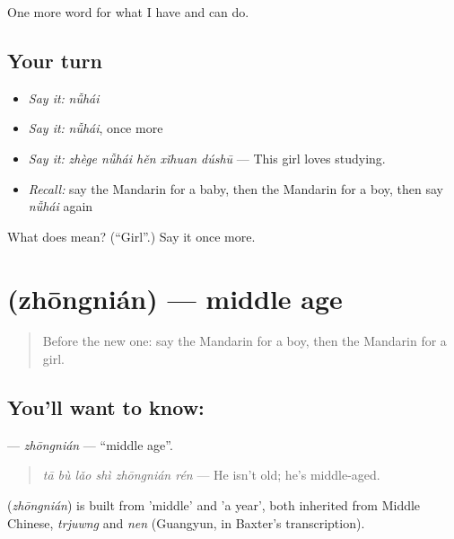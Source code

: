 \begin{grammarlens}[title={What you've built}]
One more word for what I have and can do.
\end{grammarlens}

\subsection*{Your turn}
\begin{itemize}
\raggedright
  \item \emph{Say it:} \emph{nǚhái}
  \item \emph{Say it:} \emph{nǚhái}, once more
  \item \emph{Say it:} \emph{zhège nǚhái hěn xǐhuan dúshū} — This girl loves studying.
  \item \emph{Recall:} say the Mandarin for a baby, then the Mandarin for a boy, then say \emph{nǚhái} again
\end{itemize}

\begin{tcolorbox}[breakable,colback=teal!4,colframe=teal!35!black,title={Before you move on}]
What does  mean? (\textquotedblleft{}Girl\textquotedblright{}.) Say it once more.
\end{tcolorbox}
\section[\texorpdfstring{\zh{中年} (zhōngnián)}{中年 (zhōngnián)}]{ (zhōngnián) — middle age}

\label{lesson:ZH-C266-zhongnian}



\begin{quote}
Before the new one: say the Mandarin for a boy, then the Mandarin for a girl.
\end{quote}

\subsection*{You'll want to know: }
\textbf{} — \emph{zhōngnián} — \textquotedblleft{}middle age\textquotedblright{}.

\begin{quote}
\emph{tā bù lǎo shì zhōngnián rén} — He isn't old; he's middle-aged.
\end{quote}

\begin{cousinweb}
\textbf{} (\emph{zhōngnián}) is built from  'middle' and  'a year', both inherited from Middle Chinese, \emph{trjuwng} and \emph{nen} (Guangyun, in Baxter's transcription).
\end{cousinweb}


